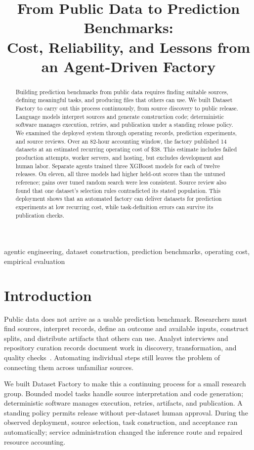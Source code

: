 \documentclass[conference,10pt,letterpaper]{IEEEtran}
\title{From Public Data to Prediction Benchmarks:\\Cost, Reliability, and Lessons from an Agent-Driven Factory}
\author{\IEEEauthorblockN{Eduardo Ari\~no de la Rubia}\IEEEauthorblockA{Central European University\\\texttt{rubiae@ceu.edu}}}
\begin{document}
\maketitle
\begin{abstract}
Building prediction benchmarks from public data requires finding suitable sources, defining meaningful tasks, and producing files that others can use. We built Dataset Factory to carry out this process continuously, from source discovery to public release. Language models interpret sources and generate construction code; deterministic software manages execution, retries, and publication under a standing release policy. We examined the deployed system through operating records, prediction experiments, and source reviews. Over an 82-hour accounting window, the factory published 14 datasets at an estimated recurring operating cost of \$38. This estimate includes failed production attempts, worker servers, and hosting, but excludes development and human labor. Separate agents trained three XGBoost models for each of twelve releases. On eleven, all three models had higher held-out scores than the untuned reference; gains over tuned random search were less consistent. Source review also found that one dataset's selection rules contradicted its stated population. This deployment shows that an automated factory can deliver datasets for prediction experiments at low recurring cost, while task-definition errors can survive its publication checks.

\end{abstract}
\begin{IEEEkeywords}agentic engineering, dataset construction, prediction benchmarks, operating cost, empirical evaluation\end{IEEEkeywords}

\section{Introduction}
Public data does not arrive as a usable prediction benchmark. Researchers must find sources, interpret records, define an outcome and available inputs, construct splits, and distribute artifacts that others can use. Analyst interviews and repository curation records document work in discovery, transformation, and quality checks~\cite{kandel,lafia}. Automating individual steps still leaves the problem of connecting them across unfamiliar sources.

We built Dataset Factory to make this a continuing process for a small research group. Bounded model tasks handle source interpretation and code generation; deterministic software manages execution, retries, artifacts, and publication. A standing policy permits release without per-dataset human approval. During the observed deployment, source selection, task construction, and acceptance ran automatically; service administration changed the inference route and repaired resource accounting.
\end{document}
